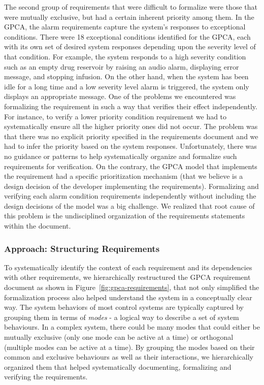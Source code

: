 The second group of requirements that were difficult to formalize were those that were mutually exclusive, but had a certain inherent priority among them. In the GPCA, the alarm requirements capture the system's responses to exceptional conditions. There were 18 exceptional conditions identified for the GPCA, each with its own set of desired system responses depending upon the severity level of that condition. For example, the system responds to a high severity condition such as an empty drug reservoir by raising an audio alarm, displaying error message, and stopping infusion. On the other hand, when the system has been idle for a long time and a low severity level alarm is triggered, the system only displays an appropriate message. One of the problems we encountered was formalizing the requirement in such a way that verifies their effect independently. For instance, to verify a lower priority condition requirement we had to systematically ensure all the higher priority ones did not occur. The problem was that there was no explicit priority specified in the requirements document and we had to infer the priority based on the system responses. Unfortunately, there was no guidance or patterns to help systematically organize and formalize such requirements for verification. On the contrary, the GPCA model that implements the requirement had a specific prioritization mechanism (that we believe is a design decision of the developer implementing the requirements). Formalizing and verifying each alarm condition requirements independently without including the design decisions of the model was a big challenge. We realized that root cause of this problem is the undisciplined organization of the requirements statements within the document.

\subsubsection {Approach: Structuring Requirements}

To systematically identify the context of each requirement and its dependencies with other requirements, we hierarchically restructured the GPCA requirement document as shown in Figure~\ref{fig:gpca-requirements}, that not only simplified the formalization process also helped understand the system in a conceptually clear way. The system behaviors of most control systems are typically captured by grouping them in terms of \emph{modes} - a logical way to describe a set of system behaviours. In a complex system, there could be many modes that could either be mutually exclusive (only one mode can be active at a time) or orthogonal (multiple modes can be active at a time). By grouping the modes based on their common and exclusive behaviours as well as their interactions, we hierarchically organized them that helped systematically documenting, formalizing and verifying the requirements.

